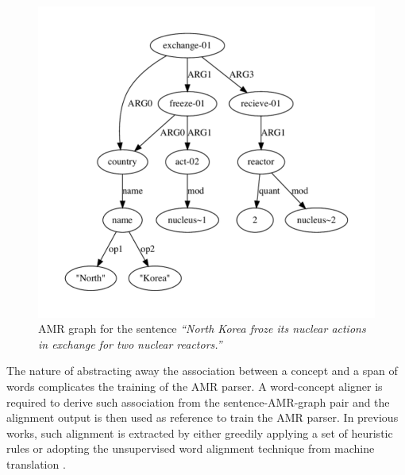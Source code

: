 \documentclass[11pt,a4paper]{article}
\begin{document}
\begin{figure}[t]
	\includegraphics[width=\columnwidth, trim={0, 1cm, 0, 1cm}, clip]{example_embedded}
	\caption{AMR graph for the sentence \textit{``North Korea froze its nuclear actions in exchange for two nuclear reactors.''}}
	\label{fig:eg_amr}
\end{figure}

The nature of abstracting away the association between a concept 
and a span of words complicates the training of the AMR parser.
A word-concept aligner is required to
derive such association from the sentence-AMR-graph pair and 
the alignment output is then used as reference to train the AMR parser.
In previous works, such alignment is extracted
by either greedily applying a set of heuristic rules
\citep{flanigan-EtAl:2014:P14-1}
or adopting the unsupervised word alignment technique from
machine translation \citep{pourdamghani-EtAl:2014:EMNLP2014,wang-xue:2017:EMNLP2017}.
\end{document}
